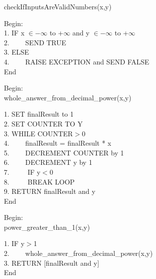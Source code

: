 \documentclass[a4paper,12pt]{article}
\begin{document}
        \vspace{0.5cm}
       
        \begin{procedure}
        \caption{ checkIfInputsAreValidNumbers(x,y)}
        Begin:\\
        1. IF  x $\in -\infty$  to  +$\infty$ and y $\in -\infty$  to  +$\infty$\\
        2. $\hspace{2em}$SEND TRUE\\
        3. ELSE\\
        4. $\hspace{2em}$RAISE EXCEPTION and SEND FALSE\\
        End\\
        \end{procedure}
        
        \vspace{0.5cm}
        
        \begin{procedure}
        Begin:\\
        \caption{ whole\_answer\_from\_decimal\_power(x,y)}
        1. SET finalResult to 1\\
        2. SET COUNTER TO Y\\
        3. WHILE COUNTER$>$0\\
        4. $\hspace{2em}$finalResult = finalResult * x\\
        5. $\hspace{2em}$DECREMENT COUNTER by 1\\
        6. $\hspace{2em}$DECREMENT y by 1\\
        7. $\hspace{2em}$ IF y$<$0\\
        8. $\hspace{2em}$ BREAK LOOP\\
        9. RETURN finalResult and y\\
        End
        
        \end{procedure}
       
        \vspace{0.5cm}
       
       \begin{procedure}
        Begin:\\
        \caption{ power\_greater\_than\_1(x,y)}
        1. IF y$>$1\\
        2. $\hspace{2em}$whole\_answer\_from\_decimal\_power(x,y)\\
        3. RETURN [finalResult and y]\\
        End
        
        \end{procedure}
       
\end{document}
